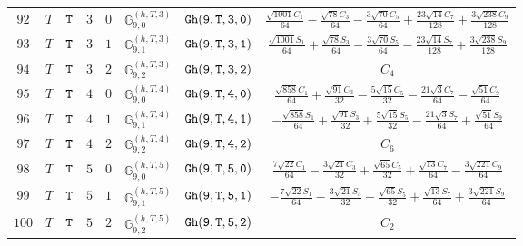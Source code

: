 \documentclass[fleqn,8pt]{jsarticle}
\begin{document}
\begin{table}[ht!]
\begin{center}
\begin{tabular}{cccccccc}
$ 92 $ & $ T $ & $ {\tt T} $ & $ 3 $ & $ 0 $ & $ \mathbb{G}_{9,0}^{(h,T,3)} $ & $ {\tt Gh(9,T,3,0)} $ & $ \frac{\sqrt{1001} C_{1}}{64} - \frac{\sqrt{78} C_{3}}{64} - \frac{3 \sqrt{70} C_{5}}{64} + \frac{23 \sqrt{14} C_{7}}{128} + \frac{3 \sqrt{238} C_{9}}{128} $ \\
$ 93 $ & $ T $ & $ {\tt T} $ & $ 3 $ & $ 1 $ & $ \mathbb{G}_{9,1}^{(h,T,3)} $ & $ {\tt Gh(9,T,3,1)} $ & $ \frac{\sqrt{1001} S_{1}}{64} + \frac{\sqrt{78} S_{3}}{64} - \frac{3 \sqrt{70} S_{5}}{64} - \frac{23 \sqrt{14} S_{7}}{128} + \frac{3 \sqrt{238} S_{9}}{128} $ \\
$ 94 $ & $ T $ & $ {\tt T} $ & $ 3 $ & $ 2 $ & $ \mathbb{G}_{9,2}^{(h,T,3)} $ & $ {\tt Gh(9,T,3,2)} $ & $ C_{4} $ \\
$ 95 $ & $ T $ & $ {\tt T} $ & $ 4 $ & $ 0 $ & $ \mathbb{G}_{9,0}^{(h,T,4)} $ & $ {\tt Gh(9,T,4,0)} $ & $ \frac{\sqrt{858} C_{1}}{64} + \frac{\sqrt{91} C_{3}}{32} - \frac{5 \sqrt{15} C_{5}}{32} - \frac{21 \sqrt{3} C_{7}}{64} - \frac{\sqrt{51} C_{9}}{64} $ \\
$ 96 $ & $ T $ & $ {\tt T} $ & $ 4 $ & $ 1 $ & $ \mathbb{G}_{9,1}^{(h,T,4)} $ & $ {\tt Gh(9,T,4,1)} $ & $ - \frac{\sqrt{858} S_{1}}{64} + \frac{\sqrt{91} S_{3}}{32} + \frac{5 \sqrt{15} S_{5}}{32} - \frac{21 \sqrt{3} S_{7}}{64} + \frac{\sqrt{51} S_{9}}{64} $ \\
$ 97 $ & $ T $ & $ {\tt T} $ & $ 4 $ & $ 2 $ & $ \mathbb{G}_{9,2}^{(h,T,4)} $ & $ {\tt Gh(9,T,4,2)} $ & $ C_{6} $ \\
$ 98 $ & $ T $ & $ {\tt T} $ & $ 5 $ & $ 0 $ & $ \mathbb{G}_{9,0}^{(h,T,5)} $ & $ {\tt Gh(9,T,5,0)} $ & $ \frac{7 \sqrt{22} C_{1}}{64} - \frac{3 \sqrt{21} C_{3}}{32} + \frac{\sqrt{65} C_{5}}{32} + \frac{\sqrt{13} C_{7}}{64} - \frac{3 \sqrt{221} C_{9}}{64} $ \\
$ 99 $ & $ T $ & $ {\tt T} $ & $ 5 $ & $ 1 $ & $ \mathbb{G}_{9,1}^{(h,T,5)} $ & $ {\tt Gh(9,T,5,1)} $ & $ - \frac{7 \sqrt{22} S_{1}}{64} - \frac{3 \sqrt{21} S_{3}}{32} - \frac{\sqrt{65} S_{5}}{32} + \frac{\sqrt{13} S_{7}}{64} + \frac{3 \sqrt{221} S_{9}}{64} $ \\
$ 100 $ & $ T $ & $ {\tt T} $ & $ 5 $ & $ 2 $ & $ \mathbb{G}_{9,2}^{(h,T,5)} $ & $ {\tt Gh(9,T,5,2)} $ & $ C_{2} $ \\
 \hline \hline
\end{tabular}
\end{center}
\end{table}
\end{document}
